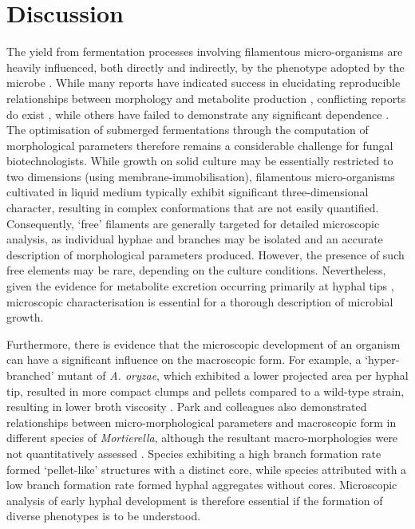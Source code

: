 \section{Discussion}

The yield from fermentation processes involving filamentous micro-organisms are heavily influenced, both directly and indirectly, by the phenotype adopted by the microbe \cite{papagiannireview,znidarsic2001}. While many reports have indicated success in elucidating reproducible relationships between morphology and metabolite production \cite{carlsen1996a,truong2004,elenshasy2006,couri2003,papagianni2006a,xu2000, papagianni1998, jppark2002, dobson2008b, dobson2008a}, conflicting reports do exist  \cite{kisser1980,paul1999,ali2006}, while others have failed to demonstrate any significant dependence \cite{johansen1998,amanullah1999,papagianni1994,muller2002,amanullah2002}. The optimisation of submerged fermentations through the computation of morphological parameters therefore remains a considerable challenge for fungal biotechnologists. While growth on solid culture may be essentially restricted to two dimensions (using membrane-immobilisation), filamentous micro-organisms cultivated in liquid medium typically exhibit significant three-dimensional character, resulting in complex conformations that are not easily quantified. Consequently, \lq free' filaments are generally targeted for detailed microscopic analysis, as individual hyphae and branches may be isolated and an accurate description of morphological parameters produced. However, the presence of such free elements may be rare, depending on the culture conditions. Nevertheless, given the evidence for metabolite excretion occurring primarily at hyphal tips \cite{wosten1991,muller2002}, microscopic characterisation is essential for a thorough description of microbial growth. 

Furthermore, there is evidence that the microscopic development of an organism can have a significant influence on the macroscopic form. For example, a \lq hyper-branched' mutant of \emph{A. oryzae}, which exhibited  a lower projected area per hyphal tip, resulted in more compact clumps and pellets compared to a wild-type strain, resulting in lower broth viscosity \cite{muller2002,muller2003}. Park and colleagues also demonstrated relationships between micro-morphological parameters and macroscopic form in different species of \emph{Mortierella}, although the resultant macro-morphologies were not quantitatively assessed \cite{eypark2006}. Species exhibiting a high branch formation rate formed \lq pellet-like' structures with a distinct core, while species attributed with a low branch formation rate formed hyphal aggregates without cores. Microscopic analysis of early hyphal development is therefore essential if the formation of diverse phenotypes is to be understood.

